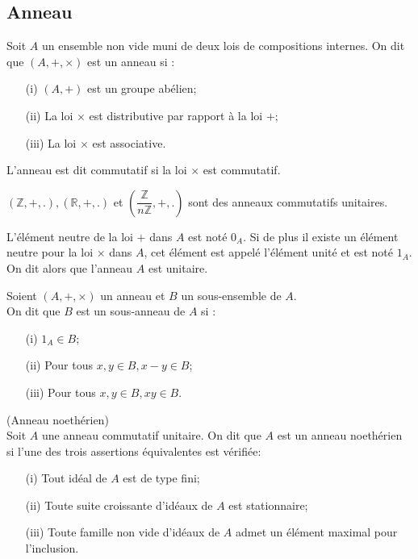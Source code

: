 \subsection{Anneau}
\begin{madefinition}
	Soit $A$ un ensemble non vide muni de deux lois de compositions internes. On dit que $(A, +, \times)$ est un anneau si :
	\begin{enumerate}
		\item[(i)] $(A,+)$ est un groupe abélien;
		\item[(ii)] La loi $\times$ est distributive par rapport à la loi $+$;
		\item[(iii)] La loi $\times$ est associative.
	\end{enumerate}
	L'anneau est dit commutatif si la loi $\times$ est commutatif.
\end{madefinition}
\begin{monexemple}
	$(\mathbb{Z}, +, .), (\mathbb{R}, +, .)$ et $(\dfrac{\mathbb{Z}}{n\mathbb{Z}}, +,.)$ sont des anneaux commutatifs unitaires.
\end{monexemple}
\begin{maremarque}
	L'élément neutre de la loi $+$ dans $A$ est noté $0_A$. Si de plus il existe un élément neutre pour la loi $\times$ dans $A$, cet élément est appelé l'élément unité et est noté $1_A$. On dit alors que l'anneau $A$ est unitaire.
\end{maremarque}
\begin{madefinition}
	Soient $(A, + , \times)$ un anneau et $B$ un sous-ensemble de $A$.\\ On dit que $B$ est un sous-anneau de $A$ si :
	\begin{enumerate}
		\item[(i)] $1_A \in B$;
		\item[(ii)] Pour tous $x, y \in B, x-y \in B$;
		\item[(iii)] Pour tous $x, y \in B, xy \in B$.
	\end{enumerate}
\end{madefinition}
\begin{maproposition}
	(Anneau noethérien)\\
	Soit $A$ une anneau commutatif unitaire. On dit que $A$ est un anneau noethérien si l'une des trois assertions équivalentes est vérifiée:
	\begin{enumerate}
		\item[(i)] Tout idéal de $A$ est de type fini;
		\item[(ii)] Toute suite croissante d'idéaux de $A$ est stationnaire;
		\item[(iii)] Toute famille non vide d'idéaux de $A$ admet un élément maximal pour l'inclusion.
	\end{enumerate} 
\end{maproposition}
